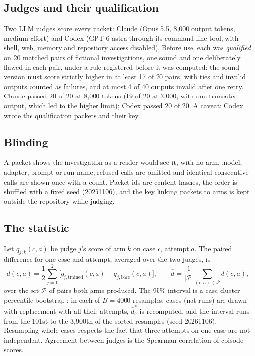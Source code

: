 \subsection{Judges and their qualification}
Two LLM judges score every packet: Claude (Opus 5.5, 8{,}000 output tokens, medium effort) and Codex (GPT-6-astra
through its command-line tool, with shell, web, memory and repository access disabled). Before use, each was
\emph{qualified} on 20 matched pairs of fictional investigations, one sound and one deliberately flawed in each pair,
under a rule registered before it was computed: the sound version must score strictly higher in at least 17 of 20
pairs, with ties and invalid outputs counted as failures, and at most 4 of 40 outputs invalid after one retry. Claude
passed 20 of 20 at 8{,}000 tokens (19 of 20 at 3{,}000, with one truncated output, which led to the higher limit);
Codex passed 20 of 20. A caveat: Codex wrote the qualification packets and their key.

\subsection{Blinding}
A packet shows the investigation as a reader would see it, with no arm, model, adapter, prompt or run name; refused
calls are omitted and identical consecutive calls are shown once with a count. Packet ids are content hashes, the order
is shuffled with a fixed seed (20261106), and the key linking packets to arms is kept outside the repository while
judging.

\subsection{The statistic}
Let $q_{j,k}(c, a)$ be judge $j$'s score of arm $k$ on case $c$, attempt $a$. The paired difference for one
case and attempt, averaged over the two judges, is
\begin{equation}
  d(c, a) = \frac{1}{2}\sum_{j=1}^{2}\bigl[q_{j,\text{trained}}(c, a) - q_{j,\text{base}}(c, a)\bigr],
  \qquad \bar d = \frac{1}{|\mathcal{P}|}\sum_{(c,a)\in\mathcal{P}} d(c, a),
\end{equation}
over the set $\mathcal{P}$ of pairs both arms produced. The 95\% interval is a case-cluster percentile bootstrap
\citep{efron1993bootstrap}: in each of $B = 4000$ resamples, cases (not runs) are drawn with replacement with all their
attempts, $\bar d^{*}_b$ is recomputed, and the interval runs from the 101st to the 3{,}900th of the sorted resamples
(seed 20261106). Resampling whole cases respects the fact that three attempts on one case are not independent.
Agreement between judges is the Spearman correlation of episode scores.

